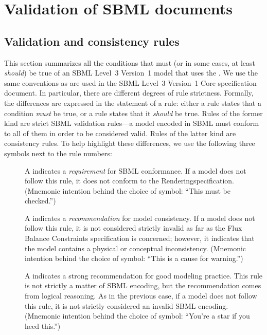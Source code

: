 \section{Validation of SBML documents} \label{apdx-validation}

\subsection{Validation and consistency rules} \label{validation-rules}

This section summarizes all the conditions that must (or in some cases,
at least \emph{should}) be true of an SBML Level~3 Version~1 model that
uses the \RenderPackage. We use the same conventions as are used in the
SBML Level~3 Version~1 Core specification document. In particular, there
are different degrees of rule strictness. Formally, the differences are
expressed in the statement of a rule: either a rule states that a
condition \emph{must} be true, or a rule states that it \emph{should} be
true. Rules of the former kind are strict SBML validation rules---a
model encoded in SBML must conform to all of them in order to be
considered valid. Rules of the latter kind are consistency rules. To
help highlight these differences, we use the following three symbols
next to the rule numbers:

\begin{description}

\item[\hspace*{6.5pt}\vSymbol\vsp] A \vSymbolName indicates a
\emph{requirement} for SBML conformance. If a model does not follow this
rule, it does not conform to the Renderingspecification.
(Mnemonic intention behind the choice of symbol: ``This must be
checked.'')

\item[\hspace*{6.5pt}\cSymbol\csp] A \cSymbolName indicates a
\emph{recommendation} for model consistency. If a model does not follow
this rule, it is not considered strictly invalid as far as the Flux
Balance Constraints specification is concerned; however, it indicates
that the model contains a physical or conceptual inconsistency.
(Mnemonic intention behind the choice of symbol: ``This is a cause for
warning.'')

\item[\hspace*{6.5pt}\mSymbol\msp] A \mSymbolName indicates a strong
recommendation for good modeling practice. This rule is not strictly a
matter of SBML encoding, but the recommendation comes from logical
reasoning. As in the previous case, if a model does not follow this
rule, it is not strictly considered an invalid SBML encoding. (Mnemonic
intention behind the choice of symbol: ``You're a star if you heed
this.'')

\end{description}

